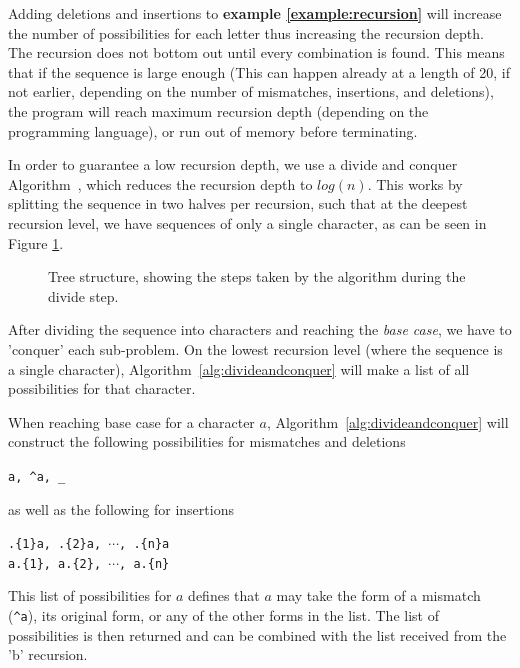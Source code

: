 \documentclass[12pt]{article}
\theoremstyle{definition}
\begin{document}
Adding deletions and insertions to \textbf{example \ref{example:recursion}} will increase the number of possibilities for each letter thus increasing the recursion depth. The recursion does not bottom out until every combination is found. This means that if the sequence is large enough (This can happen already at a length of 20, if not earlier, depending on the number of mismatches, insertions, and deletions), the program will reach maximum recursion depth (depending on the programming language), or run out of memory before terminating.

In order to guarantee a low recursion depth, we use a divide and conquer Algorithm~\cite{Algorithms}, which reduces the recursion depth to $log(n)$. This works by splitting the sequence in two halves per recursion, such that at the deepest recursion level, we have sequences of only a single character, as can be seen in Figure \ref{fig:tree_example}. 

\begin{figure}[H]
	\centering
	\caption{Tree structure, showing the steps taken by the algorithm during the divide step.}
	\label{fig:tree_example}
\end{figure}

After dividing the sequence into characters and reaching the \emph{base case}, we have to 'conquer' each sub-problem. On the lowest recursion level (where the sequence is a single character), Algorithm~\ref{alg:divideandconquer} will make a list of all possibilities for that character.

\begin{definition}[label=definition:possibilities]
When reaching base case for a character $a$, Algorithm~\ref{alg:divideandconquer} will construct the following possibilities for mismatches and deletions

\begin{center}
	\texttt{a, \^{}a, \_}
\end{center}

\noindent as well as the following for insertions

\begin{center}
	\texttt{.\{1\}a, .\{2\}a, $\cdots$, .\{n\}a} \\
	\texttt{a.\{1\}, a.\{2\}, $\cdots$, a.\{n\}}
\end{center}

\noindent This list of possibilities for $a$ defines that $a$ may take the form of a mismatch (\texttt{\^{}a}), its original form, or any of the other forms in the list. The list of possibilities is then returned and can be combined with the list received from the 'b' recursion.
\end{definition}
\end{document}
